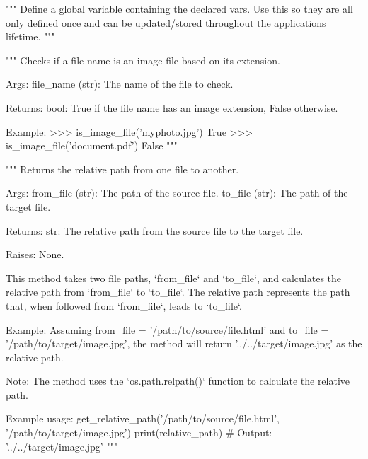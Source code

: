 \begin{codebox}[global\_vars = MMORPDND\_VARS()]
"""
Define a global variable containing the declared vars. Use this so they are all only defined once and can be updated/stored throughout the applications lifetime.
"""
\end{codebox}

\begin{codebox}
"""
	Checks if a file name is an image file based on its extension.
	
Args:
	file_name (str): The name of the file to check.
	
Returns:
	bool: True if the file name has an image extension, False otherwise.
	
Example:
	>>> is_image_file('myphoto.jpg')
	True
	>>> is_image_file('document.pdf')
	False
"""
\end{codebox}


\begin{codebox}
"""
Returns the relative path from one file to another.

Args:
	from_file (str): The path of the source file.
	to_file (str): The path of the target file.

Returns:
	str: The relative path from the source file to the target file.

Raises:
	None.

This method takes two file paths, `from_file` and `to_file`, and calculates the relative path from `from_file`
to `to_file`. The relative path represents the path that, when followed from `from_file`, leads to `to_file`.

Example:
	Assuming from_file = '/path/to/source/file.html' and to_file = '/path/to/target/image.jpg',
	the method will return '../../target/image.jpg' as the relative path.

Note: 
	The method uses the `os.path.relpath()` function to calculate the relative path.

Example usage:
	get_relative_path('/path/to/source/file.html', '/path/to/target/image.jpg')
	print(relative_path)  # Output: '../../target/image.jpg'
"""
\end{codebox}



